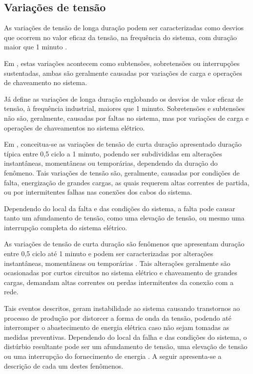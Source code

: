 \subsection{Variações de tensão}\label{qeeVarTens}
%
\par
As variações de tensão de longa duração podem ser caracterizadas como desvios que ocorrem no valor eficaz da tensão, na frequência do sistema, com duração maior que 1 minuto \citep{DUG96}.
\par 
Em \cite{DEL03}, estas variações acontecem como subtensões, sobretensões ou interrupções sustentadas, ambas são geralmente causadas por variações de carga e operações de chaveamento no sistema.
\par 
Já \cite{FER99} define as variações de longa duração englobando os desvios de valor eficaz de tensão, à frequência industrial, maiores que 1 minuto. Sobretensões e subtensões não são, geralmente, causadas por faltas no sistema, mas por variações de carga e operações de chaveamentos no sistema elétrico.

\par 
Em \cite{DUG96}, conceitua-se as variações de tensão de curta duração apresentado duração típica entre 0,5 ciclo a 1 minuto, podendo ser subdivididas em alterações instantâneas, momentâneas ou temporárias, dependendo da duração do fenômeno. Tais variações de tensão são, geralmente, causadas por condições de falta, energização de grandes cargas, as quais requerem altas correntes de partida, ou por intermitentes falhas nas conexões dos cabos do sistema. 
\par 
Dependendo do local da falta e das condições do sistema, a falta pode causar tanto um afundamento de tensão, como uma elevação de tensão, ou mesmo uma interrupção completa do sistema elétrico.
\par 
As variações de tensão de curta duração são fenômenos que apresentam duração entre 0,5 ciclo até 1 minuto e podem ser caracterizadas por alterações instantâneas, momentâneas ou temporárias \cite{JUN09}. Tais alterações geralmente são ocasionadas por curtos circuitos no sistema elétrico e chaveamento de grandes cargas, demandam altas correntes ou perdas intermitentes da conexão com a rede. 
\par 
Tais eventos descritos, geram instabilidade ao sistema causando transtornos ao processo de produção por distorcer a forma de onda da tensão, podendo até interromper o abastecimento de energia elétrica caso não sejam tomadas as medidas preventivas. Dependendo do local da falha e das condições do sistema, o distúrbio resultante pode ser um afundamento de tensão, uma elevação de tensão ou uma interrupção do fornecimento de energia \citep{IEE95}. A seguir apresenta-se a descrição de cada um destes fenômenos.

